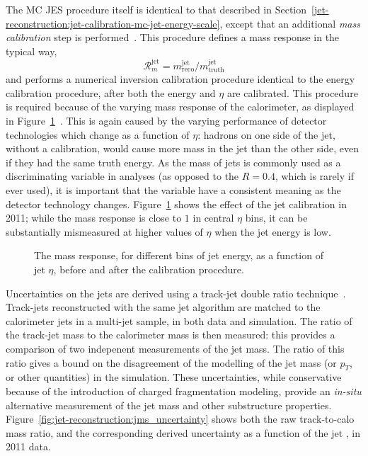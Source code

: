 The MC JES procedure itself is identical to that described in Section~\ref{jet-reconstruction:jet-calibration-mc-jet-energy-scale}, except that an additional \textit{mass calibration} step is performed~\cite{ATLAS-SS-2011}. This procedure defines a mass response in the typical way,
%
\begin{equation}
\mathcal{R}^{\mathrm{jet}}_m = m^{\mathrm{jet}}_{\mathrm{reco}} /  m^{\mathrm{jet}}_{\mathrm{truth}} 
\end{equation}
%
and performs a numerical inversion calibration procedure identical to the energy calibration procedure, after both the energy and $\eta$ are calibrated. This procedure is required because of the varying mass response of the calorimeter, as displayed in Figure~\ref{fig:jet-reconstruction:total_jms}~\cite{ATLAS-SS-2011}. This is again caused by the varying performance of detector technologies which change as a function of $\eta$: hadrons on one side of the jet, without a calibration, would cause more mass in the jet than the other side, even if they had the same truth energy. As the mass of \largeR jets is commonly used as a discriminating variable in analyses (as opposed to the $R=0.4$, which is rarely if ever used), it is important that the variable have a consistent meaning as the detector technology changes. Figure~\ref{fig:jet-reconstruction:total_jms} shows the effect of the jet calibration in 2011; while the mass response is close to $1$ in central $\eta$ bins, it can be substantially mismeasured at higher values of $\eta$ when the jet energy is low.

\begin{figure}
\centering
{}
\caption{The mass response, for different bins of jet energy, as a function of jet $\eta$, before and after the calibration procedure.}
\label{fig:jet-reconstruction:total_jms}
\end{figure}

Uncertainties on the \largeR jets are derived using a track-jet double ratio technique~\cite{ATLAS-SS-2011}. Track-jets reconstructed with the same jet algorithm are matched to the calorimeter jets in a multi-jet sample, in both data and simulation. The ratio of the track-jet mass to the calorimeter mass is then measured: this provides a comparison of two indepenent measurements of the jet mass. The ratio of this ratio gives a bound on the disagreement of the modelling of the jet mass (or $p_T$, or other quantities) in the simulation.  These uncertainties, while conservative because of the introduction of charged fragmentation modeling, provide an \textit{in-situ} alternative measurement of the jet mass and other substructure properties. Figure~\ref{fig:jet-reconstruction:jms_uncertainty} shows both the raw track-to-calo mass ratio, and the corresponding derived uncertainty as a function of the jet \pt, in 2011 data.

